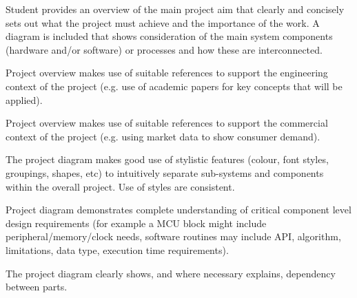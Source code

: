 Student provides an overview of the main project aim that clearly and concisely sets out what the project must achieve and the importance of the work. A diagram is included that shows consideration of the main system components (hardware and/or software) or processes and how these are interconnected.

Project overview makes use of suitable references to support the engineering context of the project (e.g. use of academic papers for key concepts that will be applied).

Project overview makes use of suitable references to support the commercial context of the project (e.g. using market data to show consumer demand).

The project diagram makes good use of stylistic features (colour, font styles, groupings, shapes, etc) to intuitively separate sub-systems and components within the overall project. Use of styles are consistent.

Project diagram demonstrates complete understanding of critical component level design requirements (for example a MCU block might include peripheral/memory/clock needs, software routines may include API, algorithm, limitations, data type, execution time requirements).

The project diagram clearly shows, and where necessary explains, dependency between parts.